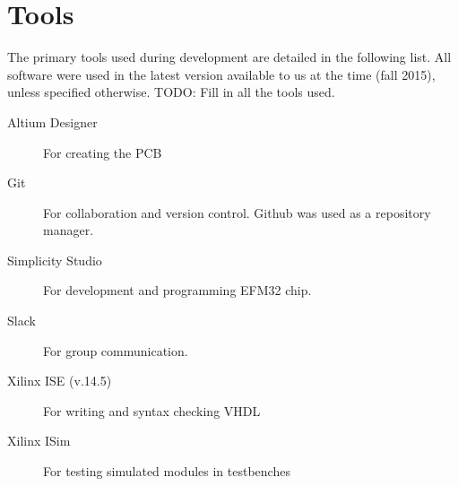 \chapter{Tools}
The primary tools used during development are detailed in the following list. All software were used in the latest version available to us at the time (fall 2015), unless specified otherwise.
TODO: Fill in all the tools used.

\begin{description}
    \item[Altium Designer] For creating the PCB
    \item[Git] For collaboration and version control. Github was used as a repository manager.
    \item[Simplicity Studio] For development and programming EFM32 chip.
    \item[Slack] For group communication.
    \item[Xilinx ISE (v.14.5)] For writing and syntax checking VHDL
    \item[Xilinx ISim] For testing simulated modules in testbenches
\end{description}
